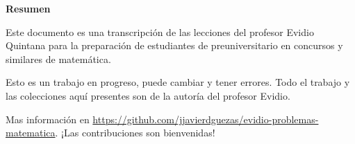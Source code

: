 \fancyhf{} %
\fancyhead[RO,R]{\thepage} %
\renewcommand{\headrulewidth}{0pt}

\begin{center}
    
    
    
    \textbf{Resumen}
\end{center}

Este documento es una transcripción de las lecciones del profesor Evidio Quintana para la preparación de estudiantes de preuniversitario en concursos y similares de matemática. 

Esto es un trabajo en progreso, puede cambiar y tener errores. Todo el trabajo y las colecciones aquí presentes son de la autoría del profesor Evidio.

Mas información en \href{https://github.com/jjavierdguezas/evidio-problemas-matematica}{https://github.com/jjavierdguezas/evidio-problemas-matematica}. ¡Las contribuciones son bienvenidas!